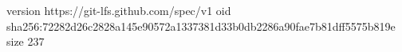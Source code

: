 version https://git-lfs.github.com/spec/v1
oid sha256:72282d26c2828a145e90572a1337381d33b0db2286a90fae7b81dff5575b819e
size 237
